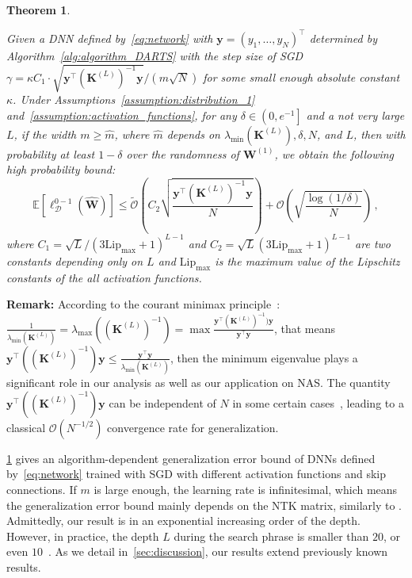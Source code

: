 \documentclass[nohyperref]{article}
\theoremstyle{plain}
\newtheorem{theorem}{Theorem}
\theoremstyle{definition}
\theoremstyle{remark}
\begin{document}
\begin{theorem}
\label{thm:NTK_Generalization}

Given a DNN defined by~\cref{eq:network} with $\bm{y} = (y_1, \dots, y_N)^{\top}$ determined by Algorithm~\ref{alg:algorithm_DARTS} with the step size of SGD $\gamma = \kappa C_1 \cdot \sqrt{\bm{y}^{\top}({\bm{K}^{(L)}})^{-1}\bm{y}}/({m}\sqrt{N}) $ for some small enough absolute constant $\kappa$. Under Assumptions~\ref{assumption:distribution_1} and~\ref{assumption:activation_functions}, for any $\delta \in \left ( 0,e^{-1} \right ]$ and a not very large $L$, if the width $m \geq \hat{m}$, where $\hat{m}$ depends on $ \lambda_{\min}(\bm{K}^{(L)}), \delta, N$, and $L$, then with probability at least $1-\delta$ over the randomness of $\bm{W}^{(1)}$, we obtain the following high probability bound:
\begin{equation*}
\mathbb{E}[\ell_{\mathcal{D} }^{0-\!1}\!(\hat{\bm{W}}\!)] \leq \tilde{\mathcal{O} } \left(\! C_2\sqrt{\frac{\bm{y}^{\top}  ({\bm{K}^{(L)}})^{-1} \bm{y}}{N}} \!\right) + \mathcal{O}\!\left(  \sqrt{\frac{\log(1/\delta )}{N} }  \right)\,,
\end{equation*}
where $C_1 = \sqrt{L}/(3\mathrm{Lip}_{\max}+1)^{L-1}$ and $C_2 = \sqrt{L}(3\mathrm{Lip}_{\max}+1)^{L-1}$ are two constants depending only on $L$ and $\mathrm{Lip}_{\max}$ is the maximum value of the Lipschitz constants of the all activation functions.
\end{theorem}


{\bf Remark:} According to the courant minimax principle~\citep{10.5555/248979}: $\frac{1}{\lambda_{\min}(\bm{K}^{(L)})} =\lambda_{\max}(({\bm{K}^{(L)}})^{-1}) = \max \frac{\bm{y}^{\top}({\bm{K}^{(L)}})^{-1})\bm{y}}{\bm{y}^{\top}\bm{y}}$, that means $\bm{y}^{\top}(({\bm{K}^{(L)}})^{-1})\bm{y} \leq \frac{\bm{y}^{\top}\bm{y}}{\lambda_{\min}(\bm{K}^{(L)})}$, then the minimum eigenvalue plays a significant role in our analysis as well as our application on NAS.
The quantity $\bm{y}^{\top}(({\bm{K}^{(L)}})^{-1})\bm{y}$ can be independent of $N$ in some certain cases~\citep{arora2019fine}, leading to a classical $\mathcal{O}({N^{-1/2}})$ convergence rate for generalization.

\cref{thm:NTK_Generalization} gives an algorithm-dependent generalization error bound of DNNs defined by~\cref{eq:network} trained with SGD with different activation functions and skip connections.
If $m$ is large enough, the learning rate is infinitesimal, which means the generalization error bound mainly depends on the NTK matrix, similarly to \citet{cao2019generalization,du2019gradient}. Admittedly, our result is in an exponential increasing order of the depth. However, in practice, the depth $L$ during the search phrase is smaller than $20$, or even $10$~\citep{liu2018hierarchical, dong2021nats}. As we detail in~\cref{sec:discussion}, our results extend previously known results.
\end{document}
